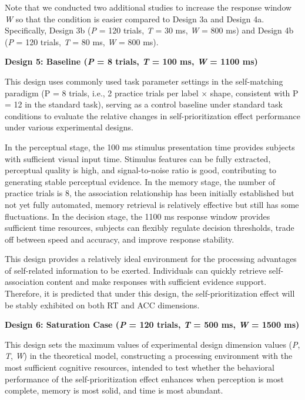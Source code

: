 \documentclass[
  english,
  man,floatsintext]{apa6}
\begin{document}
Note that we conducted two additional studies to increase the response window \emph{W} so that the condition is easier compared to Design 3a and Design 4a. Specifically, Design 3b (\emph{P} = 120 trials, \emph{T} = 30 ms, \emph{W} = 800 ms) and Design 4b (\emph{P} = 120 trials, \emph{T} = 80 ms, \emph{W} = 800 ms).

\textbf{Design 5: Baseline (\emph{P} = 8 trials, \emph{T} = 100 ms, \emph{W} = 1100 ms)}

This design uses commonly used task parameter settings in the self-matching paradigm (P = 8 trials, i.e., 2 practice trials per label \(\times\) shape, consistent with P = 12 in the standard task), serving as a control baseline under standard task conditions to evaluate the relative changes in self-prioritization effect performance under various experimental designs.

In the perceptual stage, the 100 ms stimulus presentation time provides subjects with sufficient visual input time. Stimulus features can be fully extracted, perceptual quality is high, and signal-to-noise ratio is good, contributing to generating stable perceptual evidence. In the memory stage, the number of practice trials is 8, the association relationship has been initially established but not yet fully automated, memory retrieval is relatively effective but still has some fluctuations. In the decision stage, the 1100 ms response window provides sufficient time resources, subjects can flexibly regulate decision thresholds, trade off between speed and accuracy, and improve response stability.

This design provides a relatively ideal environment for the processing advantages of self-related information to be exerted. Individuals can quickly retrieve self-association content and make responses with sufficient evidence support. Therefore, it is predicted that under this design, the self-prioritization effect will be stably exhibited on both RT and ACC dimensions.

\textbf{Design 6: Saturation Case (\emph{P} = 120 trials, \emph{T} = 500 ms, \emph{W} = 1500 ms)}

This design sets the maximum values of experimental design dimension values (\emph{P}, \emph{T}, \emph{W}) in the theoretical model, constructing a processing environment with the most sufficient cognitive resources, intended to test whether the behavioral performance of the self-prioritization effect enhances when perception is most complete, memory is most solid, and time is most abundant.
\end{document}
